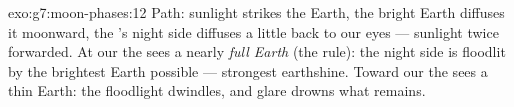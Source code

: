 \begin{solution}{exo:g7:moon-phases:12}
Path: sunlight strikes the Earth, the bright Earth diffuses it
moonward, the 's night side diffuses a little back to our
eyes --- sunlight twice forwarded. At our   the
 sees a nearly \emph{full Earth} (the  rule):
the night side is floodlit by the brightest Earth possible ---
strongest earthshine. Toward our  the  sees a thin
 Earth: the floodlight dwindles, and  glare
drowns what remains.
\end{solution}

